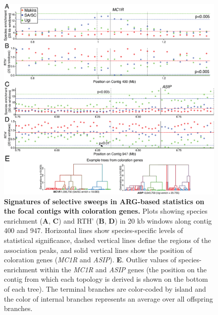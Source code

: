 \begin{figure}
    \centering
    \includegraphics[width=\textwidth]{monarcha_figs/mon_F4.PNG}
    \caption[Signatures of selective sweeps in \ac{ARG}-based statistics on the focal contigs with coloration genes.]{\textbf{Signatures of selective sweeps in \ac{ARG}-based statistics on the focal contigs with coloration genes.} Plots showing species enrichment (\textbf{A}, \textbf{C}) and \acs{RTH}’ (\textbf{B}, \textbf{D}) in 20 kb windows along contig 400 and 947. Horizontal lines show species-specific levels of statistical significance, dashed vertical lines define the regions of the association peaks, and solid vertical lines show the position of coloration genes (\textit{MC1R} and \textit{ASIP}). \textbf{E}. Outlier values of species-enrichment within the \textit{MC1R} and \textit{ASIP} genes (the position on the contig from which each topology is derived is shown on the bottom of each tree). The terminal branches are color-coded by island and the color of internal branches represents an average over all offspring branches.}
    \label{fig:mon-F4}
\end{figure}

